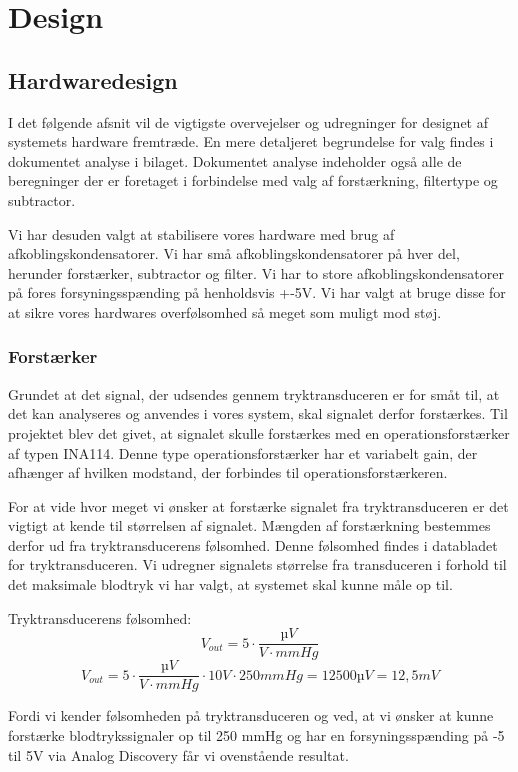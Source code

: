 \chapter{Design}
\section{Hardwaredesign}
\vspace{0.5cm}
I det følgende afsnit vil de vigtigste overvejelser og udregninger for designet af systemets hardware fremtræde. En mere detaljeret begrundelse for valg findes i dokumentet analyse i bilaget. Dokumentet analyse indeholder også alle de beregninger der er foretaget i forbindelse med valg af forstærkning, filtertype og subtractor.

Vi har desuden valgt at stabilisere vores hardware med brug af afkoblingskondensatorer. Vi har små afkoblingskondensatorer på hver del, herunder forstærker, subtractor og filter. Vi har to store afkoblingskondensatorer på fores forsyningsspænding på henholdsvis +-5V. Vi har valgt at bruge disse for at sikre vores hardwares overfølsomhed så meget som muligt mod støj. 

\subsection{Forstærker}
\vspace{0.5cm}
Grundet at det signal, der udsendes gennem tryktransduceren er for småt til, at det kan analyseres og anvendes i vores system, skal signalet derfor forstærkes. Til projektet blev det givet, at signalet skulle forstærkes med en operationsforstærker af typen INA114. Denne type operationsforstærker har et variabelt gain, der afhænger af hvilken modstand, der forbindes til operationsforstærkeren.

For at vide hvor meget vi ønsker at forstærke signalet fra tryktransduceren er det vigtigt at kende til størrelsen af signalet. Mængden af forstærkning bestemmes derfor ud fra tryktransducerens følsomhed. Denne følsomhed findes i databladet for tryktransduceren. Vi udregner signalets størrelse fra transduceren i forhold til det maksimale blodtryk vi har valgt, at systemet skal kunne måle op til.

Tryktransducerens følsomhed:
\[ V_{out} =5\cdot\frac{µV}{V\cdot mmHg}\]  
\[ V_{out} =5\cdot\frac{µV}{V\cdot mmHg} \cdot 10 V \cdot 250 mmHg = 12500 µV = 12,5 mV\]

Fordi vi kender følsomheden på tryktransduceren og ved, at vi ønsker at kunne forstærke blodtrykssignaler op til 250 mmHg og har en forsyningsspænding på -5 til 5V via Analog Discovery får vi ovenstående resultat.

